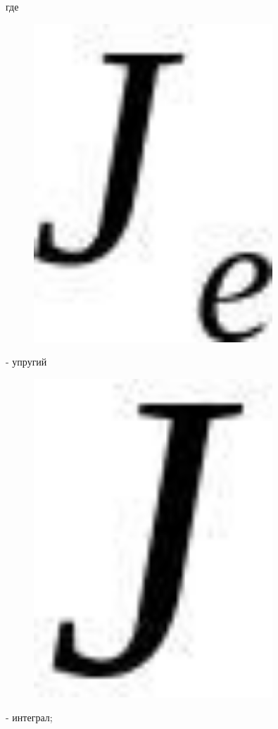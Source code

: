 где\begin{figure}[H]
	\centering
	\includegraphics[width=0.8\textwidth]{assets/1164}
	\caption*{}
\end{figure}- упругий
\begin{figure}[H]
	\centering
	\includegraphics[width=0.8\textwidth]{assets/1165}
	\caption*{}
\end{figure} - интеграл;
